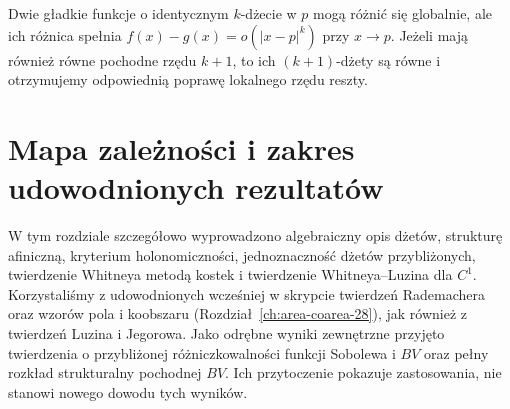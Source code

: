 \begin{przyklad}
Dwie gładkie funkcje o identycznym $k$-dżecie w $p$
mogą różnić się globalnie, ale ich różnica
spełnia $f(x)-g(x)=o(|x-p|^k)$ przy $x\to p$.
Jeżeli mają również równe pochodne rzędu $k+1$,
to ich $(k+1)$-dżety są równe i otrzymujemy
odpowiednią poprawę lokalnego rzędu reszty.
\end{przyklad}

\section{Mapa zależności i zakres udowodnionych rezultatów}
\begin{center}
\end{center}

\begin{uwaga}
W tym rozdziale szczegółowo wyprowadzono algebraiczny opis
dżetów, strukturę afiniczną, kryterium holonomiczności,
jednoznaczność dżetów przybliżonych, twierdzenie Whitneya
metodą kostek i twierdzenie Whitneya--Luzina dla $C^1$.
Korzystaliśmy z udowodnionych wcześniej w skrypcie
twierdzeń Rademachera oraz wzorów pola i koobszaru
(Rozdział~\ref{ch:area-coarea-28}), jak również
z twierdzeń Luzina i Jegorowa.
Jako odrębne wyniki zewnętrzne przyjęto twierdzenia
o przybliżonej różniczkowalności funkcji Sobolewa i $BV$
oraz pełny rozkład strukturalny pochodnej $BV$.
Ich przytoczenie pokazuje zastosowania, nie stanowi
nowego dowodu tych wyników.
\end{uwaga}


